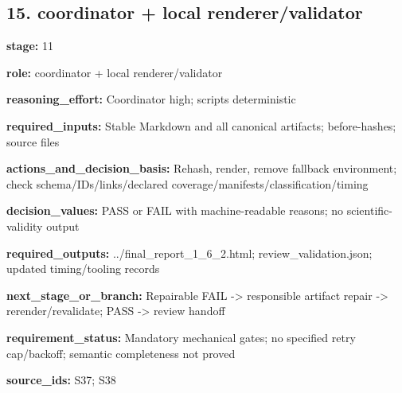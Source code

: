 \documentclass[10pt,a4paper]{article}
\begin{document}
\subsection*{15.\allowbreak{} coordinator + local renderer/\allowbreak{}validator}
\textbf{stage:} 11\par
\textbf{role:} coordinator + local renderer/\allowbreak{}validator\par
\textbf{reasoning\_\allowbreak{}effort:} Coordinator high; scripts deterministic\par
\textbf{required\_\allowbreak{}inputs:} Stable Markdown and all canonical artifacts; before-\allowbreak{}hashes; source files\par
\textbf{actions\_\allowbreak{}and\_\allowbreak{}decision\_\allowbreak{}basis:} Rehash, render, remove fallback environment; check schema/\allowbreak{}IDs/\allowbreak{}links/\allowbreak{}declared coverage/\allowbreak{}manifests/\allowbreak{}classification/\allowbreak{}timing\par
\textbf{decision\_\allowbreak{}values:} PASS or FAIL with machine-\allowbreak{}readable reasons; no scientific-\allowbreak{}validity output\par
\textbf{required\_\allowbreak{}outputs:} .\allowbreak{}.\allowbreak{}/\allowbreak{}final\_\allowbreak{}report\_\allowbreak{}1\_\allowbreak{}6\_\allowbreak{}2.\allowbreak{}html; review\_\allowbreak{}validation.\allowbreak{}json; updated timing/\allowbreak{}tooling records\par
\textbf{next\_\allowbreak{}stage\_\allowbreak{}or\_\allowbreak{}branch:} Repairable FAIL -\allowbreak{}> responsible artifact repair -\allowbreak{}> rerender/\allowbreak{}revalidate; PASS -\allowbreak{}> review handoff\par
\textbf{requirement\_\allowbreak{}status:} Mandatory mechanical gates; no specified retry cap/\allowbreak{}backoff; semantic completeness not proved\par
\textbf{source\_\allowbreak{}ids:} S37; S38\par
\end{document}
